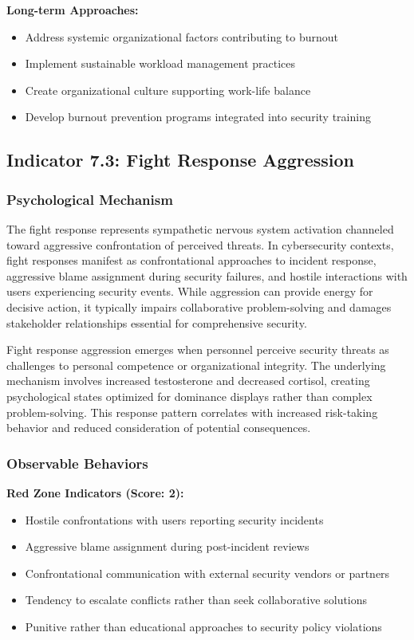 \documentclass[11pt,a4paper]{article}
\begin{document}
\textbf{Long-term Approaches:}
\begin{itemize}
\item Address systemic organizational factors contributing to burnout
\item Implement sustainable workload management practices
\item Create organizational culture supporting work-life balance
\item Develop burnout prevention programs integrated into security training
\end{itemize}

\subsection{Indicator 7.3: Fight Response Aggression}

\subsubsection{Psychological Mechanism}

The fight response represents sympathetic nervous system activation channeled toward aggressive confrontation of perceived threats\cite{cannon1932}. In cybersecurity contexts, fight responses manifest as confrontational approaches to incident response, aggressive blame assignment during security failures, and hostile interactions with users experiencing security events. While aggression can provide energy for decisive action, it typically impairs collaborative problem-solving and damages stakeholder relationships essential for comprehensive security\cite{anderson2002}.

Fight response aggression emerges when personnel perceive security threats as challenges to personal competence or organizational integrity. The underlying mechanism involves increased testosterone and decreased cortisol, creating psychological states optimized for dominance displays rather than complex problem-solving\cite{mehta2008}. This response pattern correlates with increased risk-taking behavior and reduced consideration of potential consequences\cite{riskfight2021}.

\subsubsection{Observable Behaviors}

\textbf{Red Zone Indicators (Score: 2):}
\begin{itemize}
\item Hostile confrontations with users reporting security incidents
\item Aggressive blame assignment during post-incident reviews
\item Confrontational communication with external security vendors or partners
\item Tendency to escalate conflicts rather than seek collaborative solutions
\item Punitive rather than educational approaches to security policy violations
\end{itemize}
\end{document}
